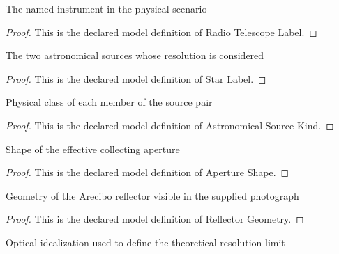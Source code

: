 \begin{definition}
  \label{def:physics:phyx-mini-0132:phyxminiproblems-problemphyxmini0132-radiotelescopelabel}
  The named instrument in the physical scenario
\end{definition}
\begin{proof}
  This is the declared model definition of Radio Telescope Label.
\end{proof}
\begin{definition}
  \label{def:physics:phyx-mini-0132:phyxminiproblems-problemphyxmini0132-starlabel}
  The two astronomical sources whose resolution is considered
\end{definition}
\begin{proof}
  This is the declared model definition of Star Label.
\end{proof}
\begin{definition}
  \label{def:physics:phyx-mini-0132:phyxminiproblems-problemphyxmini0132-astronomicalsourcekind}
  Physical class of each member of the source pair
\end{definition}
\begin{proof}
  This is the declared model definition of Astronomical Source Kind.
\end{proof}
\begin{definition}
  \label{def:physics:phyx-mini-0132:phyxminiproblems-problemphyxmini0132-apertureshape}
  Shape of the effective collecting aperture
\end{definition}
\begin{proof}
  This is the declared model definition of Aperture Shape.
\end{proof}
\begin{definition}
  \label{def:physics:phyx-mini-0132:phyxminiproblems-problemphyxmini0132-reflectorgeometry}
  Geometry of the Arecibo reflector visible in the supplied photograph
\end{definition}
\begin{proof}
  This is the declared model definition of Reflector Geometry.
\end{proof}
\begin{definition}
  \label{def:physics:phyx-mini-0132:phyxminiproblems-problemphyxmini0132-resolutionregime}
  Optical idealization used to define the theoretical resolution limit
\end{definition}
